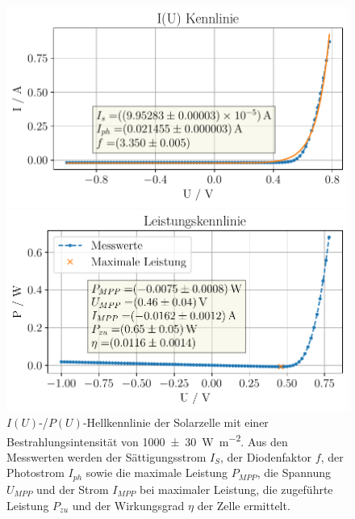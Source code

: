 \documentclass[english, ngerman]{scrartcl}
\begin{document}
\setcaphanging
%
\setcapindent{0pt}
\begin{figure}[H]
    \centering
    \begin{minipage}[t]{0.485\linewidth}
        \centering
        \includegraphics[width=\linewidth]{fig/plots/1000_UI.pdf}
    \end{minipage}%
    \hspace*{\fill}
    \begin{minipage}[t]{0.485\linewidth}
        \centering
        \includegraphics[width=\linewidth]{fig/plots/1000_P.pdf}
    \end{minipage}
    \caption[$I(U)$-/$P(U)$-Hellkennlinie Solarzelle -- Sonnensimulator]{$I(U)$-/$P(U)$-Hellkennlinie der Solarzelle mit einer Bestrahlungsintensität von \SI{1000(30)}{\watt\per\meter\squared}. Aus den Messwerten werden der Sättigungsstrom $I_S$, der Diodenfaktor $f$, der Photostrom $I_{ph}$ sowie die maximale Leistung $P_{MPP}$, die Spannung $U_{MPP}$ und der Strom $I_{MPP}$ bei maximaler Leistung, die zugeführte Leistung $P_{zu}$ und der Wirkungsgrad $\eta$ der Zelle ermittelt.}
    \label{fig:solar_Hell_1000}
\end{figure}
\setcaphanging
\end{document}

